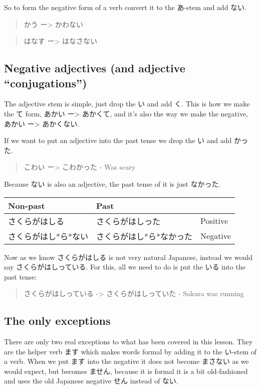 \documentclass[11pt]{article}
\begin{document}
So to form the negative form of a verb convert it to the あ-stem and add ない.
\begin{quote}
かう ー> かわない
\end{quote}
\begin{quote}
はなす ー> はなさない
\end{quote}

\subsection{Negative adjectives (and adjective ``conjugations'')}
\label{sec:org68e8cd0}
The adjective stem is simple, just drop the い and add く. This is how we make the て form, あかい ー> あかくて, and it's also the way we make the negative, あかい ー> あかくない.

If we want to put an adjective into the past tense we drop the い and add かった.
\begin{quote}
こわい ー> こわかった - Was scary
\end{quote}

Because ない is also an adjective, the past tense of it is just なかった.

\begin{center}
\begin{tabular}{lll}
Non-past & Past & \\
\hline
さくらがはしる & さくらがはしった & Positive\\
さくらがはし*ら*ない & さくらがはし*ら*なかった & Negative\\
\end{tabular}
\end{center}

Now as we know さくらがはしる is not very natural Japanese, instead we would say さくらがはしっている. For this, all we need to do is put the いる into the past tense:
\begin{quote}
さくらがはしっている -> さくらがはしっていた - Sakura was running
\end{quote}

\subsection{The only exceptions}
\label{sec:org2676d55}
There are only two real exceptions to what has been covered in this lesson. They are the helper verb ます which makes words formal by adding it to the い-stem of a verb. When we put ます into the negative it does not become まさない as we would expect, but becomes ません, because it is formal it is a bit old-fashioned and uses the old Japanese negative せん instead of ない.
\end{document}
